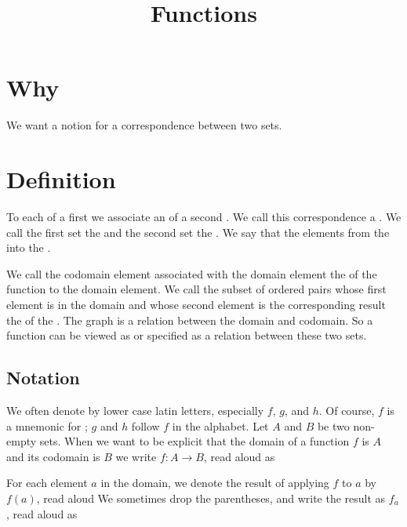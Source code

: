 






\title{Functions}

\section{Why}
We want a notion for a correspondence between two sets.

\section{Definition}

To each  of a first  we associate an  of a second .
We call this correspondence a .
We call the first set the  and the second set the .
We say that the   elements from the  into the .

We call the codomain element associated with the domain element the  of  the function to the domain element.
We call the subset of ordered pairs whose first element is in the domain and whose second element is the corresponding result the  of the .
The graph is a relation between the domain and codomain.
So a function can be viewed as or specified as a relation between these two sets.

\subsection{Notation}
We often denote  by lower case latin letters, especially $f$, $g$, and $h$.
Of course, $f$ is a mnemonic for ; $g$ and $h$ follow $f$ in the alphabet.
Let $A$ and $B$ be two non-empty sets.
When we want to be explicit that the domain of a function $f$ is $A$ and its codomain is $B$ we write $f: A \to B$, read aloud as 


For each element $a$ in the domain, we denote the result of applying $f$ to $a$ by $f(a)$, read aloud 
We sometimes drop the parentheses, and write the result as $f_a$, read aloud as 


